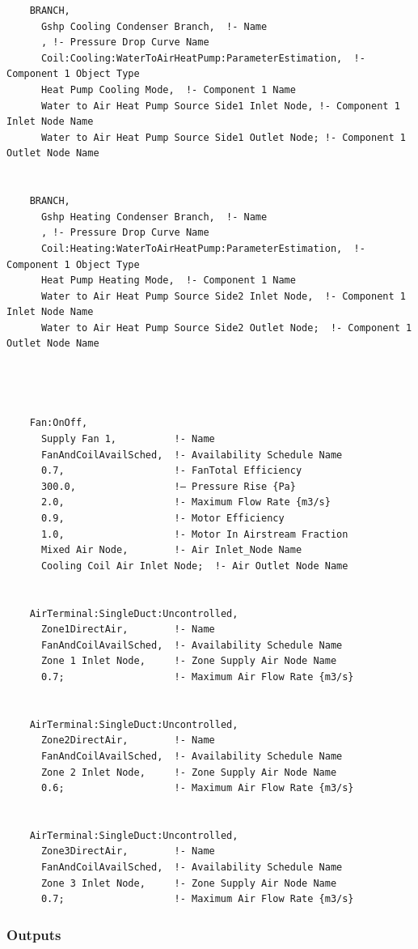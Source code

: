 \begin{lstlisting}
    BRANCH,
      Gshp Cooling Condenser Branch,  !- Name
      , !- Pressure Drop Curve Name
      Coil:Cooling:WaterToAirHeatPump:ParameterEstimation,  !- Component 1 Object Type
      Heat Pump Cooling Mode,  !- Component 1 Name
      Water to Air Heat Pump Source Side1 Inlet Node, !- Component 1 Inlet Node Name
      Water to Air Heat Pump Source Side1 Outlet Node; !- Component 1 Outlet Node Name


    BRANCH,
      Gshp Heating Condenser Branch,  !- Name
      , !- Pressure Drop Curve Name
      Coil:Heating:WaterToAirHeatPump:ParameterEstimation,  !- Component 1 Object Type
      Heat Pump Heating Mode,  !- Component 1 Name
      Water to Air Heat Pump Source Side2 Inlet Node,  !- Component 1 Inlet Node Name
      Water to Air Heat Pump Source Side2 Outlet Node;  !- Component 1 Outlet Node Name




    Fan:OnOff,
      Supply Fan 1,          !- Name
      FanAndCoilAvailSched,  !- Availability Schedule Name
      0.7,                   !- FanTotal Efficiency
      300.0,                 !– Pressure Rise {Pa}
      2.0,                   !- Maximum Flow Rate {m3/s}
      0.9,                   !- Motor Efficiency
      1.0,                   !- Motor In Airstream Fraction
      Mixed Air Node,        !- Air Inlet_Node Name
      Cooling Coil Air Inlet Node;  !- Air Outlet Node Name


    AirTerminal:SingleDuct:Uncontrolled,
      Zone1DirectAir,        !- Name
      FanAndCoilAvailSched,  !- Availability Schedule Name
      Zone 1 Inlet Node,     !- Zone Supply Air Node Name
      0.7;                   !- Maximum Air Flow Rate {m3/s}


    AirTerminal:SingleDuct:Uncontrolled,
      Zone2DirectAir,        !- Name
      FanAndCoilAvailSched,  !- Availability Schedule Name
      Zone 2 Inlet Node,     !- Zone Supply Air Node Name
      0.6;                   !- Maximum Air Flow Rate {m3/s}


    AirTerminal:SingleDuct:Uncontrolled,
      Zone3DirectAir,        !- Name
      FanAndCoilAvailSched,  !- Availability Schedule Name
      Zone 3 Inlet Node,     !- Zone Supply Air Node Name
      0.7;                   !- Maximum Air Flow Rate {m3/s}
\end{lstlisting}

\subsubsection{Outputs}\label{outputs-6-011}

